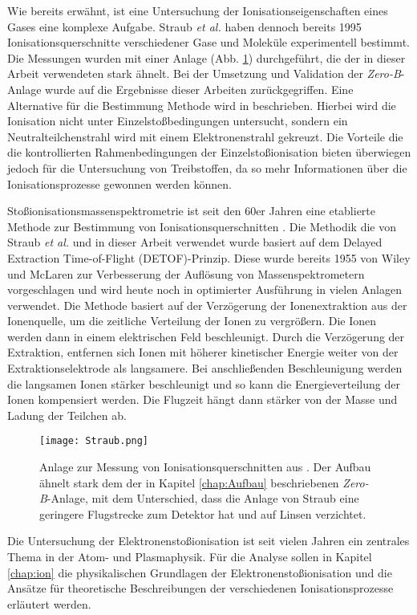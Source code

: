 Wie bereits erwähnt, ist eine Untersuchung der Ionisationseigenschaften eines Gases eine komplexe Aufgabe. Straub \textit{et al.} \cite{Straub}\cite{Straub2} haben dennoch bereits 1995 Ionisationsquerschnitte verschiedener Gase und Moleküle experimentell bestimmt. Die Messungen wurden mit einer Anlage (Abb. \ref{fig:Straub}) durchgeführt, die der in dieser Arbeit verwendeten stark ähnelt. Bei der Umsetzung und Validation der \textit{Zero-B}-Anlage wurde auf die Ergebnisse dieser Arbeiten zurückgegriffen. Eine Alternative für die Bestimmung Methode wird in \cite{other_method} beschrieben. Hierbei wird die Ionisation nicht unter Einzelstoßbedingungen untersucht, sondern ein Neutralteilchenstrahl wird mit einem Elektronenstrahl gekreuzt. Die Vorteile die die kontrollierten Rahmenbedingungen der Einzelstoßionisation bieten überwiegen jedoch für die Untersuchung von Treibstoffen, da so mehr Informationen über die Ionisationsprozesse gewonnen werden können.

Stoßionisationsmassenspektrometrie ist seit den 60er Jahren eine etablierte Methode zur Bestimmung von Ionisationsquerschnitten \cite{EITOFMS}. Die Methodik die von Straub \textit{et al.} und in dieser Arbeit verwendet wurde basiert auf dem Delayed Extraction Time-of-Flight (DETOF)-Prinzip. Diese wurde bereits 1955 von Wiley und McLaren zur Verbesserung der Auflösung von Massenspektrometern vorgeschlagen \cite{DETOF} und wird heute noch in optimierter Ausführung in vielen Anlagen verwendet. Die Methode basiert auf der Verzögerung der Ionenextraktion aus der Ionenquelle, um die zeitliche Verteilung der Ionen zu vergrößern. Die Ionen werden dann in einem elektrischen Feld beschleunigt. Durch die Verzögerung der Extraktion, entfernen sich Ionen mit höherer kinetischer Energie weiter von der Extraktionselektrode als langsamere. Bei anschließenden Beschleunigung werden die langsamen Ionen stärker beschleunigt und so kann die Energieverteilung der Ionen kompensiert werden. Die Flugzeit hängt dann stärker von der Masse und Ladung der Teilchen ab. 

\begin{figure}
    \centering
    \texttt{[image: Straub.png]}
    \caption[Anlage zur Messung von Ionisationsquerschnitten aus \cite{Straub2}]{Anlage zur Messung von Ionisationsquerschnitten aus \cite{Straub2}. Der Aufbau ähnelt stark dem der in Kapitel \ref{chap:Aufbau} beschriebenen \textit{Zero-B}-Anlage, mit dem Unterschied, dass die Anlage von Straub eine geringere Flugstrecke zum Detektor hat und auf Linsen verzichtet.}
    \label{fig:Straub}
\end{figure}

Die Untersuchung der Elektronenstoßionisation ist seit vielen Jahren ein zentrales Thema in der Atom- und Plasmaphysik. Für die Analyse sollen in Kapitel \ref{chap:ion} die physikalischen Grundlagen der Elektronenstoßionisation und die Ansätze für theoretische Beschreibungen der verschiedenen Ionisationsprozesse erläutert werden.